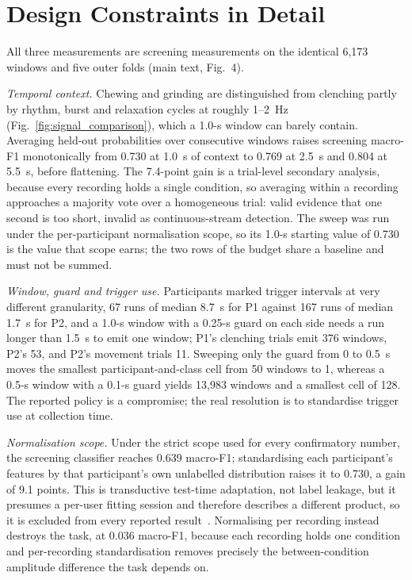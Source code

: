 \documentclass[journal]{IEEEtran}
\begin{document}
\section{Design Constraints in Detail}
\label{sec:s_design}

All three measurements are screening measurements on the identical 6,173 windows and five outer folds (main text, Fig.~4).

\textit{Temporal context.} Chewing and grinding are distinguished from clenching partly by rhythm, burst and relaxation cycles at roughly 1--2~Hz (Fig.~\ref{fig:signal_comparison}), which a 1.0-s window can barely contain. Averaging held-out probabilities over consecutive windows raises screening macro-F1 monotonically from 0.730 at 1.0~s of context to 0.769 at 2.5~s and 0.804 at 5.5~s, before flattening. The 7.4-point gain is a trial-level secondary analysis, because every recording holds a single condition, so averaging within a recording approaches a majority vote over a homogeneous trial: valid evidence that one second is too short, invalid as continuous-stream detection. The sweep was run under the per-participant normalisation scope, so its 1.0-s starting value of 0.730 is the value that scope earns; the two rows of the budget share a baseline and must not be summed.

\textit{Window, guard and trigger use.} Participants marked trigger intervals at very different granularity, 67 runs of median 8.7~s for P1 against 167 runs of median 1.7~s for P2, and a 1.0-s window with a 0.25-s guard on each side needs a run longer than 1.5~s to emit one window; P1's clenching trials emit 376 windows, P2's 53, and P2's movement trials 11. Sweeping only the guard from 0 to 0.5~s moves the smallest participant-and-class cell from 50 windows to 1, whereas a 0.5-s window with a 0.1-s guard yields 13,983 windows and a smallest cell of 128. The reported policy is a compromise; the real resolution is to standardise trigger use at collection time.

\textit{Normalisation scope.} Under the strict scope used for every confirmatory number, the screening classifier reaches 0.639 macro-F1; standardising each participant's features by that participant's own unlabelled distribution raises it to 0.730, a gain of 9.1 points. This is transductive test-time adaptation, not label leakage, but it presumes a per-user fitting session and therefore describes a different product, so it is excluded from every reported result~\cite{besomi2020consensus}. Normalising per recording instead destroys the task, at 0.036 macro-F1, because each recording holds one condition and per-recording standardisation removes precisely the between-condition amplitude difference the task depends on.
\end{document}

